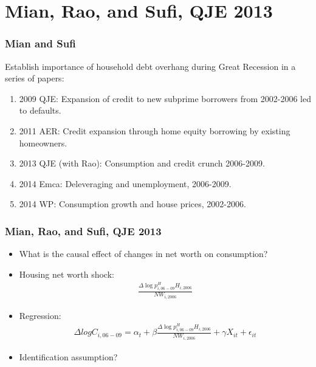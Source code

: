\documentclass[english,xcolor=svgnames]{beamer}
\begin{document}
\section{Mian, Rao, and Sufi, QJE 2013}


\begin{frame}
\frametitle[alignment=center]{Mian and Sufi}
Establish importance of household debt overhang during Great Recession in a series of papers:\\
\begin{enumerate}
	\item 2009 QJE: Expansion of credit to new subprime borrowers from 2002-2006 led to defaults.
	\item 2011 AER: Credit expansion through home equity borrowing by existing homeowners.
	\item 2013 QJE (with Rao): Consumption and credit crunch 2006-2009.
	\item 2014 Emca: Deleveraging and unemployment, 2006-2009.
	\item 2014 WP: Consumption growth and house prices, 2002-2006.
\end{enumerate}
\end{frame}



\begin{frame}
\frametitle[alignment=center]{Mian, Rao, and Sufi, QJE 2013}
\begin{itemize}
	\item What is the causal effect of changes in net worth on consumption?
	\item Housing net worth shock:
	\begin{align*}
		\frac{\Delta \log p^H_{i,06-09}H_{i,2006}}{NW_{i,2006}}
	\end{align*}
	\item Regression:
	\begin{align*}
		\Delta log C_{i,06-09} = \alpha_t + \beta \frac{\Delta \log p^H_{i,06-09}H_{i,2006}}{NW_{i,2006}} + \gamma X_{it} + \epsilon_{it}
	\end{align*}
	\item Identification assumption?
\end{itemize}
\end{frame}
\end{document}
